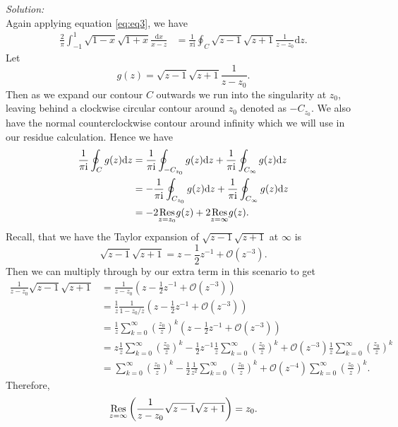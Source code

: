 \documentclass[10pt]{amsart}
\newcommand{\D}{\mathrm{d}}
\newcommand{\I}{\mathrm{i}}
\theoremstyle{nonumberplain}
\begin{document}
\begin{enumerate}[label={\bf {\arabic*}:}]
\begin{enumerate}
\textit{Solution:} \\
Again applying equation \eqref{eq:eq3}, we have
\begin{align*}
\frac{2}{\pi}\int_{-1}^1 {\sqrt{1-x} \sqrt{1 + x}} \frac{\D x}{x -z}
	&= \frac 1 {\pi \I} \oint_C \sqrt {z - 1} \sqrt {z + 1} \frac 1 {z - z_0} \D z.
\end{align*}
Let
$$g(z) = \sqrt {z - 1} \sqrt {z + 1} \frac 1 {z - z_0}.$$
Then as we expand our contour $C$ outwards we run into the singularity at $z_0$, leaving behind a clockwise circular contour around $z_0$ denoted as $-C_{z_0}$.
We also have the normal counterclockwise contour around infinity which we will use in our residue calculation.
Hence we have
\begin{align}
\frac 1 {\pi \I} \oint_C g(z) \D z
	&= \frac 1 {\pi \I} \oint_{-C_{z_0}} g(z) \D z + \frac 1 {\pi \I} \oint_{C_\infty} g(z) \D z \nonumber \\
	&= - \frac 1 {\pi \I} \oint_{C_{z_0}} g(z) \D z + \frac 1 {\pi \I} \oint_{C_\infty} g(z) \D z \nonumber \\
	&= - 2 \underset{z=z_0}{{\rm Res}} g(z) + 2 \underset{z=\infty}{{\rm Res}} g(z).
\label{eq:eq5}
\end{align}
Recall, that we have the Taylor expansion of $\sqrt {z - 1} \sqrt {z + 1}$ at $\infty$ is
$$
\sqrt {z - 1} \sqrt {z + 1} = z - \frac 1 2 z^{-1} + \mathcal O(z^{-3}).
$$
Then we can multiply through by our extra term in this scenario to get
\begin{align*}
\frac 1 {z - z_0}\sqrt {z - 1} \sqrt {z + 1} &= \frac 1 {z - z_0} \left(z - \frac 1 2 z^{-1} + \mathcal O(z^{-3})\right) \\
	&= \frac 1 z \frac 1 {1 - z_0/z} \left(z - \frac 1 2 z^{-1} + \mathcal O(z^{-3})\right) \\
	&= \frac 1 z \sum_{k = 0}^\infty \left(\frac {z_0} z\right)^k \left(z - \frac 1 2 z^{-1} + \mathcal O(z^{-3})\right) \\
	&=  z\frac 1 z \sum_{k = 0}^\infty \left(\frac {z_0} z\right)^k - \frac 1 2 z^{-1}\frac 1 z \sum_{k = 0}^\infty \left(\frac {z_0} z\right)^k + \mathcal O(z^{-3})\frac 1 z \sum_{k = 0}^\infty \left(\frac {z_0} z\right)^k \\
	&= \sum_{k = 0}^\infty \left(\frac {z_0} z\right)^k - \frac 1 2 \frac 1 {z^2} \sum_{k = 0}^\infty \left(\frac {z_0} z\right)^k + \mathcal O(z^{-4}) \sum_{k = 0}^\infty \left(\frac {z_0} z\right)^k.
\end{align*}
Therefore,
$$
\underset{z=\infty}{{\rm Res}} \left( \frac 1 {z - z_0}\sqrt {z - 1} \sqrt {z + 1} \right) = z_0.
$$
\end{enumerate}
\end{enumerate}
\end{document}
